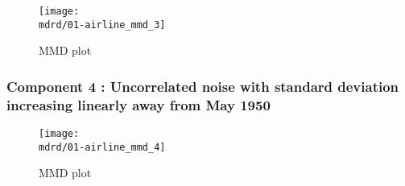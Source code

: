 \documentclass{article} %
\begin{document}
\begin{figure}[H]
\newcommand{\wmgd}{0.5\columnwidth}
\newcommand{\hmgd}{3.0cm}
\newcommand{\mdrd}{01-airline}
\newcommand{\mbm}{\hspace{-0.3cm}}
\texttt{[image: \\mdrd/01-airline\_mmd\_3]}
\caption{
MMD plot}
\label{fig:mmd3}
\end{figure}

\subsubsection{Component 4 : Uncorrelated noise with standard deviation increasing linearly away from May 1950}

\begin{figure}[H]
\newcommand{\wmgd}{0.5\columnwidth}
\newcommand{\hmgd}{3.0cm}
\newcommand{\mdrd}{01-airline}
\newcommand{\mbm}{\hspace{-0.3cm}}
\texttt{[image: \\mdrd/01-airline\_mmd\_4]}
\caption{
MMD plot}
\label{fig:mmd4}
\end{figure}
\end{document}
